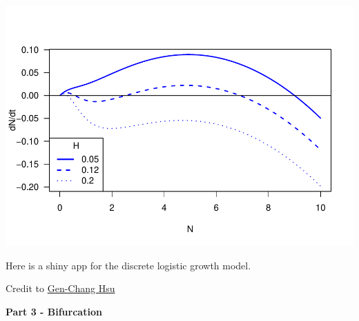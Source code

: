 \documentclass[
]{book}
\begin{document}
\includegraphics{bookdown-demo_files/figure-latex/unnamed-chunk-18-1.pdf}

Here is a shiny app for the discrete logistic growth model.

Credit to \href{https://genchanghsu.github.io/index.html}{Gen-Chang Hsu}

\textbf{Part 3 - Bifurcation}
\end{document}
